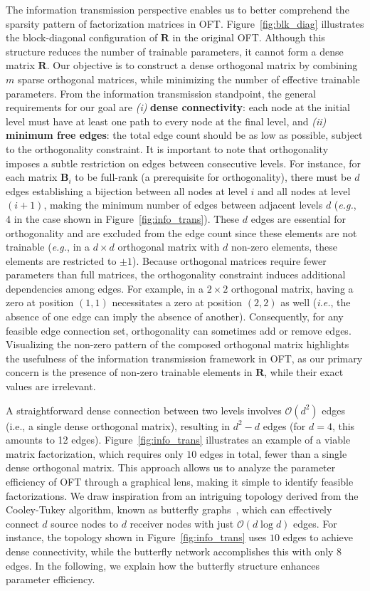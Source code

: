 The information transmission perspective enables us to better comprehend the sparsity pattern of factorization matrices in OFT. Figure~\ref{fig:blk_diag} illustrates the block-diagonal configuration of $\bm{R}$ in the original OFT. Although this structure reduces the number of trainable parameters, it cannot form a dense matrix $\bm{R}$. Our objective is to construct a dense orthogonal matrix by combining $m$ sparse orthogonal matrices, while minimizing the number of effective trainable parameters. From the information transmission standpoint, the general requirements for our goal are \emph{(i)} \textbf{dense connectivity}: each node at the initial level must have at least one path to every node at the final level, and \emph{(ii)} \textbf{minimum free edges}: the total edge count should be as low as possible, subject to the orthogonality constraint. It is important to note that orthogonality imposes a subtle restriction on edges between consecutive levels. For instance, for each matrix $\bm{B}_i$ to be full-rank (a prerequisite for orthogonality), there must be $d$ edges establishing a bijection between all nodes at level $i$ and all nodes at level $(i+1)$, making the minimum number of edges between adjacent levels $d$ (\emph{e.g.}, 4 in the case shown in Figure~\ref{fig:info_trans}). These $d$ edges are essential for orthogonality and are excluded from the edge count since these elements are not trainable (\emph{e.g.}, in a $d \times d$ orthogonal matrix with $d$ non-zero elements, these elements are restricted to $\pm 1$). Because orthogonal matrices require fewer parameters than full matrices, the orthogonality constraint induces additional dependencies among edges. For example, in a $2 \times 2$ orthogonal matrix, having a zero at position $(1,1)$ necessitates a zero at position $(2,2)$ as well (\emph{i.e.}, the absence of one edge can imply the absence of another). Consequently, for any feasible edge connection set, orthogonality can sometimes add or remove edges. Visualizing the non-zero pattern of the composed orthogonal matrix highlights the usefulness of the information transmission framework in OFT, as our primary concern is the presence of non-zero trainable elements in $\bm{R}$, while their exact values are irrelevant.

A straightforward dense connection between two levels involves $\mathcal{O}(d^2)$ edges (i.e., a single dense orthogonal matrix), resulting in $d^2-d$ edges (for $d=4$, this amounts to 12 edges). Figure~\ref{fig:info_trans} illustrates an example of a viable matrix factorization, which requires only $10$ edges in total, fewer than a single dense orthogonal matrix. This approach allows us to analyze the parameter efficiency of OFT through a graphical lens, making it simple to identify feasible factorizations. We draw inspiration from an intriguing topology derived from the Cooley-Tukey algorithm, known as butterfly graphs~\cite{cooley1965algorithm}, which can effectively connect $d$ source nodes to $d$ receiver nodes with just $\mathcal{O}(d\log d)$ edges. For instance, the topology shown in Figure~\ref{fig:info_trans} uses $10$ edges to achieve dense connectivity, while the butterfly network accomplishes this with only $8$ edges. In the following, we explain how the butterfly structure enhances parameter efficiency.

